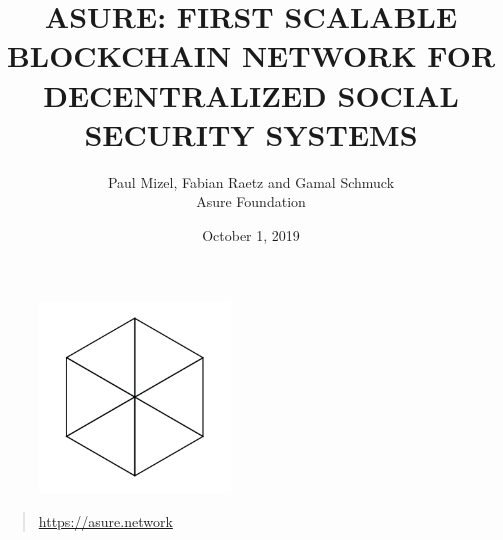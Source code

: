 \begin{figure}
    \centering
    \includegraphics[width=2.0in]{img/logo.png}
\end{figure}

\title{ASURE: FIRST SCALABLE BLOCKCHAIN NETWORK FOR DECENTRALIZED SOCIAL SECURITY SYSTEMS}
\author{Paul Mizel, Fabian Raetz and Gamal Schmuck \\Asure Foundation}
\date{October 1, 2019}
\maketitle

\vskip 2.5in

\begin{quote}
	\centering
	\url{https://asure.network}
\end{quote}

\newpage 
